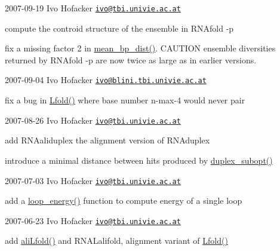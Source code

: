 2007-\/09-\/19 Ivo Hofacker \href{mailto:ivo@tbi.univie.ac.at}{\tt ivo@tbi.\+univie.\+ac.\+at}


\begin{DoxyItemize}
\item compute the controid structure of the ensemble in R\+N\+Afold -\/p
\item fix a missing factor 2 in \mbox{\hyperlink{part__func_8h_ae9556ba7ded44fe2321b6f67c3fc02a3}{mean\+\_\+bp\+\_\+dist()}}. C\+A\+U\+T\+I\+ON ensemble diversities returned by R\+N\+Afold -\/p are now twice as large as in earlier versions.
\end{DoxyItemize}

2007-\/09-\/04 Ivo Hofacker \href{mailto:ivo@blini.tbi.univie.ac.at}{\tt ivo@blini.\+tbi.\+univie.\+ac.\+at}


\begin{DoxyItemize}
\item fix a bug in \mbox{\hyperlink{group__local__mfe__fold_ga16e5a70e60835bb969eaecbe6482f1be}{Lfold()}} where base number n-\/max-\/4 would never pair
\end{DoxyItemize}

2007-\/08-\/26 Ivo Hofacker \href{mailto:ivo@tbi.univie.ac.at}{\tt ivo@tbi.\+univie.\+ac.\+at}


\begin{DoxyItemize}
\item add R\+N\+Aaliduplex the alignment version of R\+N\+Aduplex
\item introduce a minimal distance between hits produced by \mbox{\hyperlink{duplex_8h_ac0842c81f606e66e465c8f746a6df29c}{duplex\+\_\+subopt()}}
\end{DoxyItemize}

2007-\/07-\/03 Ivo Hofacker \href{mailto:ivo@tbi.univie.ac.at}{\tt ivo@tbi.\+univie.\+ac.\+at}


\begin{DoxyItemize}
\item add a \mbox{\hyperlink{group__eval_ga507d4fd93f4b398d793ba2402731388d}{loop\+\_\+energy()}} function to compute energy of a single loop
\end{DoxyItemize}

2007-\/06-\/23 Ivo Hofacker \href{mailto:ivo@tbi.univie.ac.at}{\tt ivo@tbi.\+univie.\+ac.\+at}


\begin{DoxyItemize}
\item add \mbox{\hyperlink{group__local__consensus__fold_ga864db0f9c428356d978ad0600aa9a8bc}{ali\+Lfold()}} and R\+N\+A\+Lalifold, alignment variant of \mbox{\hyperlink{group__local__mfe__fold_ga16e5a70e60835bb969eaecbe6482f1be}{Lfold()}}
\end{DoxyItemize}

